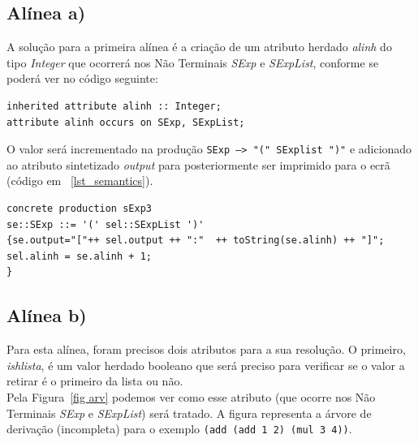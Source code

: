 \documentclass[11pt,a4paper]{article}
\begin{document}
\subsection{Alínea a)}
A solução para a primeira alínea é a criação de um atributo herdado \emph{alinh} do tipo \emph{Integer} que ocorrerá nos Não Terminais \emph{SExp} e \emph{SExpList}, conforme se poderá ver no código seguinte: 

\begin{lstlisting}[frame=single, numbers=right, basicstyle=\tiny, caption={Code to a Contextual Condition for Symbol Transition}, label={lst_semantics}]
inherited attribute alinh :: Integer;
attribute alinh occurs on SExp, SExpList;
\end{lstlisting}

O valor será incrementado na produção \texttt{SExp --> "(" SExplist ")"} e adicionado ao atributo sintetizado \emph{output} para posteriormente ser imprimido para o ecrã (código em ~\ref{lst_semantics}).

\begin{lstlisting}[frame=single, numbers=right, basicstyle=\tiny, caption={Code to a Contextual Condition for Symbol Transition}, label={lst_semantics}]
concrete production sExp3
se::SExp ::= '(' sel::SExpList ')'
{se.output="["++ sel.output ++ ":"  ++ toString(se.alinh) ++ "]";
sel.alinh = se.alinh + 1;
}
\end{lstlisting}

\subsection{Alínea b)}

Para esta alínea, foram precisos dois atributos para a sua resolução. O primeiro, \emph{ishlista}, é um valor herdado booleano que será preciso para verificar se o valor a retirar é o primeiro da lista ou não. \\

Pela Figura~\ref{fig arv} podemos ver como esse atributo (que ocorre nos Não Terminais \emph{SExp} e \emph{SExpList}) será tratado. A figura representa a árvore de derivação (incompleta) para o exemplo \texttt{(add (add 1 2) (mul 3 4))}. \\
\end{document}
